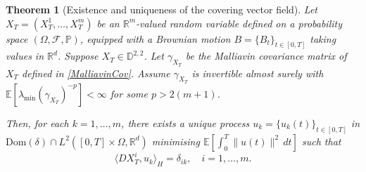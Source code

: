 \documentclass[]{interact}
\newcommand{\1}{\mathbf{1}}
\theoremstyle{plain}%
\newtheorem{theorem}{Theorem}[section]
\theoremstyle{definition}
\theoremstyle{remark}
\numberwithin{equation}{section}
\begin{document}
\begin{theorem}[Existence and uniqueness of the covering vector field]
Let $X_T = (X_T^1, \ldots, X_T^m)$ be an $\mathbb{R}^m$-valued random variable defined on a probability space $(\Omega, \mathcal{F}, \mathbb{P})$, equipped with a Brownian motion $B = \{B_t\}_{t \in [0, T]}$ taking values in $\mathbb{R}^d$. Suppose $X_T \in \mathbb{D}^{2,2}$. Let $\gamma_{X_T}$ be the Malliavin covariance matrix of $X_T$ defined in \eqref{MalliavinCov}. Assume $\gamma_{X_T}$ is invertible almost surely with $\mathbb{E}[\lambda_{\min}(\gamma_{X_T})^{-p}] < \infty$ for some $p > 2(m+1)$.

Then, for each $k = 1, \ldots, m$, there exists a unique process $u_k = \{u_k(t)\}_{t \in [0, T]}$ in $\text{Dom}(\delta) \cap L^2([0, T] \times \Omega, \mathbb{R}^d)$ minimising $\mathbb{E}[\int_0^T \|u(t)\|^2 \, dt]$ such that
\begin{equation}
\langle D X_T^i, u_k \rangle_H = \delta_{ik}, \quad i = 1, \ldots, m.
\label{cond0}
\end{equation}
\end{theorem}
\end{document}
